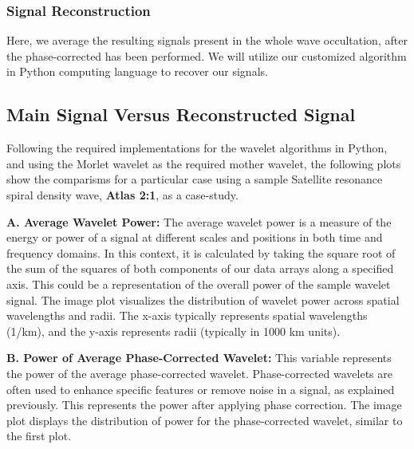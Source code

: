 \documentclass{article}
\begin{document}
\subsubsection{Signal Reconstruction}
Here, we average the resulting signals present in the whole wave occultation, after the phase-corrected has been performed. We will utilize our customized algorithm in Python computing language to recover our signals.

\subsection{Main Signal Versus Reconstructed Signal}
Following the required implementations for the wavelet algorithms in Python, and using the Morlet wavelet as the required mother wavelet, the following plots show the comparisms for a particular case using a sample Satellite resonance spiral density wave, \textbf{Atlas 2:1}, as a case-study. 


\textbf{A. Average Wavelet Power:}
The average wavelet power is a measure of the energy or power of a signal at different scales and positions in both time and frequency domains. In this context, it is calculated by taking the square root of the sum of the squares of both components of our data arrays along a specified axis. This could be a representation of the overall power of the sample wavelet signal. The image plot visualizes the distribution of wavelet power across spatial wavelengths and radii. The x-axis typically represents spatial wavelengths (1/km), and the y-axis represents radii (typically in 1000 km units).

\textbf{B. Power of Average Phase-Corrected Wavelet:}
This variable represents the power of the average phase-corrected wavelet. Phase-corrected wavelets are often used to enhance specific features or remove noise in a signal, as explained previously. This represents the power after applying phase correction. The image plot displays the distribution of power for the phase-corrected wavelet, similar to the first plot.
\end{document}

